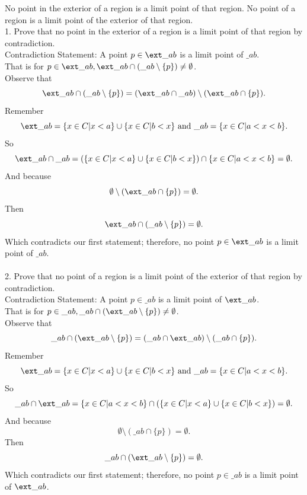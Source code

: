 \documentclass[11pt]{article}
\begin{document}
\begin{lemma}  No point in the exterior of a region is a limit point of that region.  No point of a region is a limit point of the exterior of that region.
\\1. Prove that no point in the exterior of a region is a limit point of that region by contradiction.
\\Contradiction Statement: A point $p\in \ext\_{ab}$ is a limit point of $\_{ab}$. \\That is for $p\in \ext\_{ab}, \ext\_{ab}\cap (\_{ab}\setminus \{p\})\neq \emptyset$.
\\Observe that 
\[
\ext\_{ab}\cap (\_{ab}\setminus \{p\})=(\ext\_{ab}\cap \_{ab})\setminus (\ext\_{ab}\cap \{p\}). 
\]
Remember 
\[
\ext\_{ab}=\{x\in C|x<a\} \cup \{x\in C| b<x\} \text{ and } \_{ab}=\{x\in C|a<x<b\}. 
\]
So 
\[
\ext\_{ab}\cap \_{ab}=(\{x\in C|x<a\} \cup \{x\in C| b<x\}) \cap \{x\in C|a<x<b\}=\emptyset.
\]
And because
\[
\emptyset \setminus (\ext\_{ab}\cap \{p\})=\emptyset.
\]
Then
\[
\ext\_{ab}\cap (\_{ab}\setminus \{p\})= \emptyset.
\]
Which contradicts our first statement; therefore, no point $p\in \ext\_{ab}$ is a limit point of $\_{ab}$.
\\
\\2. Prove that no point of a region is a limit point of the exterior of that region by contradiction.
\\Contradiction Statement: A point $p\in \_{ab}$ is a limit point of $\ext\_{ab}$. \\That is for $p\in \_{ab}, \_{ab}\cap (\ext\_{ab}\setminus \{p\})\neq \emptyset$.
\\Observe that 
\[
\_{ab}\cap (\ext\_{ab}\setminus \{p\})=(\_{ab}\cap \ext\_{ab})\setminus (\_{ab}\cap \{p\}). 
\]
Remember 
\[
\ext\_{ab}=\{x\in C|x<a\} \cup \{x\in C| b<x\} \text{ and } \_{ab}=\{x\in C|a<x<b\}. 
\]
So 
\[
\_{ab}\cap \ext\_{ab}=\{x\in C|a<x<b\} \cap (\{x\in C|x<a\} \cup \{x\in C| b<x\})=\emptyset.
\]
And because
\[
\emptyset \setminus (\_{ab}\cap \{p\})=\emptyset.
\]
Then
\[
\_{ab}\cap (\ext\_{ab}\setminus \{p\})= \emptyset.
\]
Which contradicts our first statement; therefore, no point $p\in \_{ab}$ is a limit point of $\ext\_{ab}$.
\end{lemma}
\end{document}
